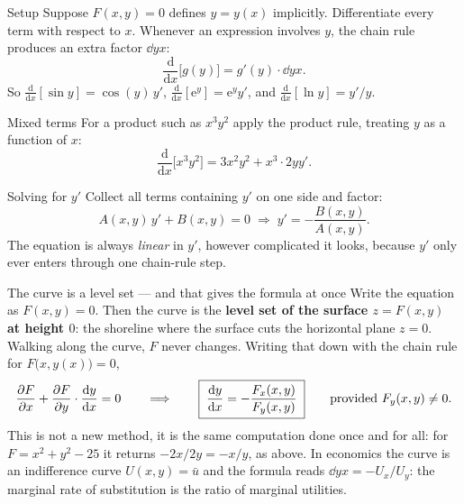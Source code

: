 \begin{rulebox}{Setup}
Suppose $F(x,y)=0$ defines $y=y(x)$ implicitly. Differentiate every term
with respect to $x$. Whenever an expression involves $y$, the chain rule
produces an extra factor $\dd{y}{x}$:
\[
  \frac{\mathrm{d}}{\mathrm{d}x}\bigl[g(y)\bigr]=g'(y)\cdot\dd{y}{x} .
\]
So $\frac{\mathrm{d}}{\mathrm{d}x}[\sin y]=\cos(y)\,y'$,
$\frac{\mathrm{d}}{\mathrm{d}x}[\mathrm{e}^{y}]=\mathrm{e}^{y}y'$, and
$\frac{\mathrm{d}}{\mathrm{d}x}[\ln y]=y'/y$.
\end{rulebox}

\begin{rulebox}{Mixed terms}
For a product such as $x^{3}y^{2}$ apply the product rule, treating $y$ as
a function of $x$:
\[
  \frac{\mathrm{d}}{\mathrm{d}x}\bigl[x^{3}y^{2}\bigr]=3x^{2}y^{2}+x^{3}\cdot 2yy' .
\]
\end{rulebox}

\begin{rulebox}{Solving for $y'$}
Collect all terms containing $y'$ on one side and factor:
\[
  A(x,y)\,y'+B(x,y)=0\;\Longrightarrow\;y'=-\frac{B(x,y)}{A(x,y)} .
\]
The equation is always \emph{linear} in $y'$, however complicated it looks,
because $y'$ only ever enters through one chain-rule step.
\end{rulebox}

\begin{rulebox}{The curve is a level set --- and that gives the formula at once}
Write the equation as $F(x,y)=0$. Then the curve is the \textbf{level set of
the surface $z=F(x,y)$ at height $0$}: the shoreline where the surface cuts
the horizontal plane $z=0$. Walking along the curve, $F$ never changes.
Writing that down with the chain rule for $F\bigl(x,y(x)\bigr)=0$,
\[
  \frac{\partial F}{\partial x}+\frac{\partial F}{\partial y}\cdot\frac{\mathrm{d}y}{\mathrm{d}x}=0
  \qquad\Longrightarrow\qquad
  \boxed{\;\frac{\mathrm{d}y}{\mathrm{d}x}=-\frac{F_{x}(x,y)}{F_{y}(x,y)}\;}
  \qquad\text{provided } F_{y}(x,y)\neq0 .
\]
This is not a new method, it is the same computation done once and for all:
for $F=x^{2}+y^{2}-25$ it returns $-2x/2y=-x/y$, as above. In economics the
curve is an indifference curve $U(x,y)=\bar u$ and the formula reads
$\dd{y}{x}=-U_{x}/U_{y}$: the marginal rate of substitution is the ratio of
marginal utilities.
\end{rulebox}

